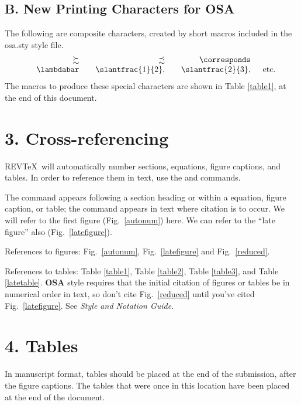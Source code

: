 \subsection*{B. New Printing Characters for OSA}
The following are composite characters, created by short macros
included in the osa.sty style file.
\begin{eqnarray*}
\begin{array}{rrrr}
\,\,\,\,\,\, \succsim & \,\,\,\,\,\, \precsim &
\,\,\,\,\,\, \corresponds & \\
\,\,\,\,\,\, \lambdabar & \,\,\,\,\,\,  \slantfrac{1}{2}, &
\,\,\,\,\,\, \slantfrac{2}{3},& \,\,\, {\rm etc.}
\end{array}
\end{eqnarray*}
The macros to produce these special characters are shown in Table
\ref{table1}, at the end of this document.

\section*{3. Cross-referencing}
REV\TeX\ will automatically number sections, equations,
figure captions, and tables. In order to
reference them in text, use the  and 
commands.

The  command appears following a section heading
or within a equation, figure
caption, or table; the  command appears in text
where citation is to occur.  We will refer to the first
figure (Fig.~\ref{autonum}) here.
We can refer to the ``late figure'' also (Fig.~\ref{latefigure}).

References to figures: Fig.~\ref{autonum}, Fig.~\ref{latefigure}
and Fig.~\ref{reduced}.

References to tables:
Table \ref{table1},
Table \ref{table2},
Table \ref{table3},   and
Table \ref{latetable}.
{\bf OSA}
style requires that the initial citation of figures or tables
be in numerical order in text, so don't cite Fig.~\ref{reduced}
until you've cited Fig.~\ref{latefigure}.
See {\it Style and Notation
Guide}.

\section*{4. Tables}
In manuscript format, tables should be placed at the end of the submission,
after the figure captions. The tables that were once in this location
have been placed at the end of the document.


